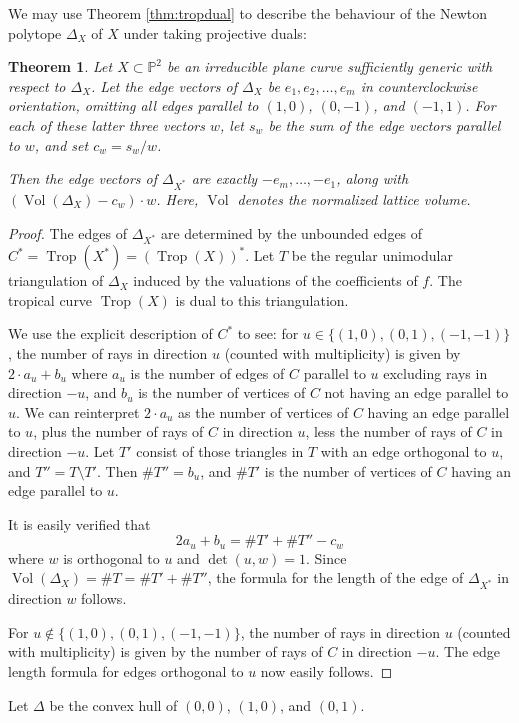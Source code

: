 \documentclass[oneside]{amsart}
\newcommand{\PP}{\mathbb{P}}
\DeclareMathOperator{\trop}{Trop}
\DeclareMathOperator{\vol}{Vol}
\newtheorem{thm}{Theorem}[section]
\theoremstyle{definition}
\begin{document}
We may use Theorem \ref{thm:tropdual} to describe the behaviour of the Newton polytope $\Delta_X$ of $X$ under taking projective duals:
\begin{thm}\label{thm:newton}
Let $X\subset \PP^2$ be an irreducible plane curve sufficiently generic with respect to $\Delta_X$. Let the edge vectors of $\Delta_X$ be $e_1,e_2,\ldots,e_m$ in counterclockwise orientation, omitting all edges parallel to $(1,0)$, $(0,-1)$, and $(-1,1)$. For each of these latter three vectors $w$, let $s_w$ be the sum of the edge vectors parallel to $w$, and set $c_w=s_w/w$. 

Then the edge vectors of $\Delta_{X^*}$ are exactly  $-e_m,\ldots,-e_1$, along with $(\vol (\Delta_X)-c_w)\cdot w$. 
Here, $\vol$ denotes the normalized lattice volume.
\end{thm}
\begin{proof}
The edges of $\Delta_{X^*}$ are determined by the unbounded edges of $C^*=\trop(X^*)=(\trop(X))^*$. 
Let $T$ be the regular unimodular triangulation of $\Delta_X$ induced by the valuations of the coefficients of $f$. The tropical curve $\trop(X)$ is dual to this triangulation.


We use the explicit description of $C^*$ to see: for $u\in \{(1,0),(0,1),(-1,-1)\}$, the number of rays in direction $u$ (counted with multiplicity) is given by $2\cdot a_u+b_u$ where $a_u$ is the number of edges of $C$ parallel to $u$ excluding rays in direction $-u$, and $b_u$ is the number of vertices of $C$ not having an edge parallel to $u$.
We can reinterpret $2\cdot a_u$ as the number of vertices of $C$ having an edge parallel to $u$, plus the number of rays of $C$ in direction $u$, less the number of rays of $C$ in direction $-u$.
Let $T'$ consist of those triangles in $T$ with an edge orthogonal to $u$, and $T''=T\setminus T'$. Then $\#T''=b_u$, and $\#T'$ is the number of vertices of $C$ having an edge parallel to $u$.

It is easily verified that 
\[2a_u+b_u=\#T'+\#T''-c_w\]
where $w$ is orthogonal to $u$ and $\det (u,w)=1$. Since $\vol(\Delta_X)=\#T=\#T'+\#T''$, the formula for the length of the edge of $\Delta_{X^*}$ in direction $w$ follows.

For $u\notin\{(1,0),(0,1),(-1,-1)\}$, 
the number of rays in direction $u$ (counted with multiplicity) is given by the number of rays of $C$ in direction $-u$. The edge length formula for edges orthogonal to $u$ now easily follows.
\end{proof}

Let $\Delta$ be the convex hull of $(0,0)$, $(1,0)$, and $(0,1)$.
\end{document}
